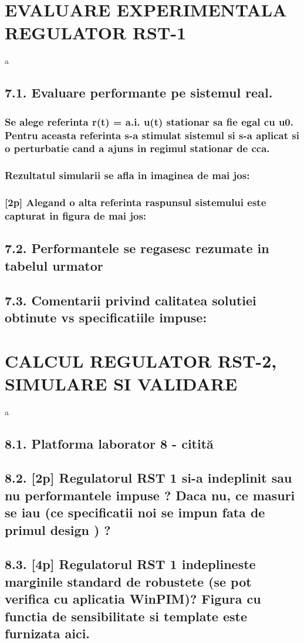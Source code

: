 \documentclass[12pt,english]{article}
\begin{document}
\section {EVALUARE EXPERIMENTALA REGULATOR RST-1 }
a
\subsection {7.1. Evaluare performante pe sistemul real. }
\subsubsection {Se alege referinta r(t) = a.i. u(t) stationar sa fie egal cu u0. Pentru aceasta referinta s-a stimulat sistemul si s-a aplicat si o perturbatie cand a ajuns in regimul stationar de cca.}
\subsubsection {Rezultatul simularii se afla in imaginea de mai jos: }
\subsubsection {[2p] Alegand o alta referinta raspunsul sistemului este capturat in figura de mai jos: }
\subsection {7.2. Performantele se regasesc rezumate in tabelul urmator }
\subsection {7.3. Comentarii privind calitatea solutiei obtinute vs specificatiile impuse: }

\section {CALCUL REGULATOR RST-2, SIMULARE SI VALIDARE }
a
\subsection {8.1. Platforma laborator 8 - citită }
\subsection {8.2. [2p] Regulatorul RST 1 si-a indeplinit sau nu performantele impuse ?  Daca nu, ce masuri se iau (ce specificatii noi se impun fata de primul design ) ? }
\subsection {8.3. [4p] Regulatorul RST 1 indeplineste marginile standard de robustete (se pot verifica cu aplicatia WinPIM)?   Figura cu functia de sensibilitate si template este furnizata aici. }
\end{document}
